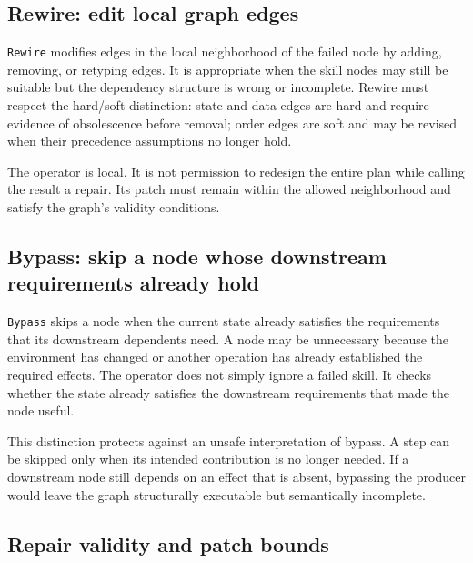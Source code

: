 \subsection{Rewire: edit local graph edges}

\texttt{Rewire} modifies edges in the local neighborhood of the failed node by adding, removing, or retyping edges. It is appropriate when the skill nodes may still be suitable but the dependency structure is wrong or incomplete. Rewire must respect the hard/soft distinction: state and data edges are hard and require evidence of obsolescence before removal; order edges are soft and may be revised when their precedence assumptions no longer hold.

The operator is local. It is not permission to redesign the entire plan while calling the result a repair. Its patch must remain within the allowed neighborhood and satisfy the graph's validity conditions.

\subsection{Bypass: skip a node whose downstream requirements already hold}

\texttt{Bypass} skips a node when the current state already satisfies the requirements that its downstream dependents need. A node may be unnecessary because the environment has changed or another operation has already established the required effects. The operator does not simply ignore a failed skill. It checks whether the state already satisfies the downstream requirements that made the node useful.

This distinction protects against an unsafe interpretation of bypass. A step can be skipped only when its intended contribution is no longer needed. If a downstream node still depends on an effect that is absent, bypassing the producer would leave the graph structurally executable but semantically incomplete.


\subsection{Repair validity and patch bounds}

